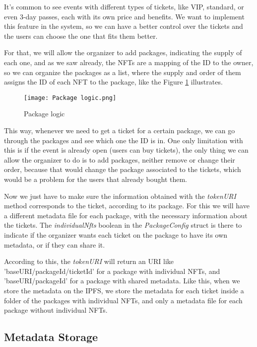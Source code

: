 It's common to see events with different types of tickets, like VIP, standard,
or even 3-day passes, each with its own price and benefits. We want to
implement this feature in the system, so we can have a better control over the
tickets and the users can choose the one that fits them better.

For that, we will allow the organizer to add packages, indicating the supply of
each one, and as we saw already, the NFTs are a mapping of the ID to the owner,
so we can organize the packages as a list, where the supply and order of them
assigns the ID of each NFT to the package, like the Figure
\ref{fig:package_logic} illustrates.

\begin{figure}[H]
	\texttt{[image: Package logic.png]}
	\centering
	\caption{Package logic}
	\label{fig:package_logic}
\end{figure}

This way, whenever we need to get a ticket for a certain package, we can go
through the packages and see which one the ID is in. One only limitation with
this is if the event is already open (users can buy tickets), the only thing we
can allow the organizer to do is to add packages, neither remove or change
their order, because that would change the package associated to the tickets,
which would be a problem for the users that already bought them.

Now we just have to make sure the information obtained with the
\textit{tokenURI} method corresponds to the ticket, according to its package.
For this we will have a different metadata file for each package, with the
necessary information about the tickets. The \textit{individualNfts} boolean in
the \textit{PackageConfig} struct is there to indicate if the organizer wants
each ticket on the package to have its own metadata, or if they can share it.

According to this, the \textit{tokenURI} will return an URI like
'baseURI/packageId/ticketId' for a package with individual NFTs, and
'baseURI/packageId' for a package with shared metadata. Like this, when we
store the metadata on the IPFS, we store the metadata for each ticket inside a
folder of the packages with individual NFTs, and only a metadata file for each
package without individual NFTs.

\subsection{Metadata Storage}
\label{subsec:metadata_storage}

